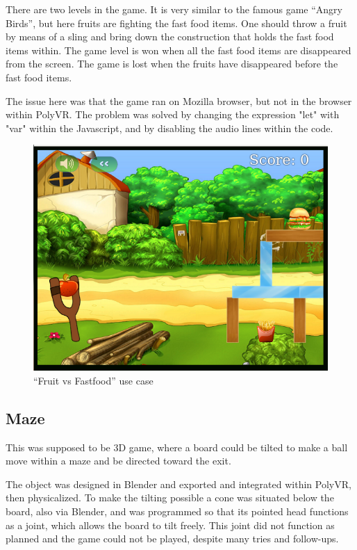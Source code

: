 There are two levels in the game. It is very similar to the famous game “Angry Birds”, but here fruits are fighting the fast food items. One should throw a fruit by means of a sling and bring down the construction that holds the fast food items within. The game level is won when all the fast food items are disappeared from the screen. The game is lost when the fruits have disappeared before the fast food items.

The issue here was that the game ran on Mozilla browser, but not in the browser within PolyVR. The problem was solved by changing the expression "let" with "var" within the Javascript, and by disabling the audio lines within the code.

\begin{figure}[!h]
	\centering
	\includegraphics[width=.8\textwidth]{./images/shant/image2.png}
	\caption{``Fruit vs Fastfood'' use case}
\end{figure}

\subsection{Maze}

This was supposed to be 3D game, where a board could be tilted to make a ball move within a maze and be directed toward the exit.

The object was designed in Blender and exported and integrated within PolyVR, then physicalized.
To make the tilting possible a cone was situated below the board, also via Blender, and was programmed so that its pointed head functions as a joint, which allows the board to tilt freely. This joint did not function as planned and the game could not be played, despite many tries and follow-ups.

